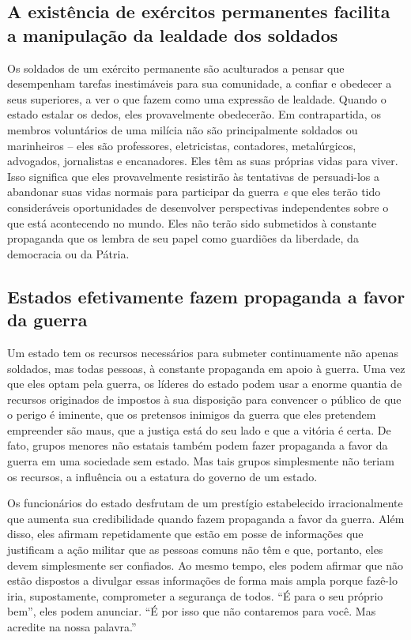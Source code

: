 \subsection*{A existência de exércitos permanentes facilita a manipulação da lealdade dos soldados}

Os soldados de um exército permanente são aculturados a pensar que desempenham tarefas inestimáveis para sua comunidade, a confiar e obedecer a seus superiores, a ver o que fazem como uma expressão de lealdade. Quando o estado estalar os dedos, eles provavelmente obedecerão. Em contrapartida, os membros voluntários de uma milícia não são principalmente soldados ou marinheiros -- eles são professores, eletricistas, contadores, metalúrgicos, advogados, jornalistas e encanadores. Eles têm as suas próprias vidas para viver. Isso significa que eles provavelmente resistirão às tentativas de persuadi-los a abandonar suas vidas normais para participar da guerra \emph{e} que eles terão tido consideráveis oportunidades de desenvolver perspectivas independentes sobre o que está acontecendo no mundo. Eles não terão sido submetidos à constante propaganda que os lembra de seu papel como guardiões da liberdade, da democracia ou da Pátria.

\subsection*{Estados efetivamente fazem propaganda a favor da guerra}

Um estado tem os recursos necessários para submeter continuamente não apenas soldados, mas todas pessoas, à constante propaganda em apoio à guerra. Uma vez que eles optam pela guerra, os líderes do estado podem usar a enorme quantia de recursos originados de impostos à sua disposição para convencer o público de que o perigo é iminente, que os pretensos inimigos da guerra que eles pretendem empreender são maus, que a justiça está do seu lado e que a vitória é certa. De fato, grupos menores não estatais também podem fazer propaganda a favor da guerra em uma sociedade sem estado. Mas tais grupos simplesmente não teriam os recursos, a influência ou a estatura do governo de um estado.

Os funcionários do estado desfrutam de um prestígio estabelecido irracionalmente que aumenta sua credibilidade quando fazem propaganda a favor da guerra. Além disso, eles afirmam repetidamente que estão em posse de informações que justificam a ação militar que as pessoas comuns não têm e que, portanto, eles devem simplesmente ser confiados. Ao mesmo tempo, eles podem afirmar que não estão dispostos a divulgar essas informações de forma mais ampla porque fazê-lo iria, supostamente, comprometer a segurança de todos. ``É para o seu próprio bem'', eles podem anunciar. ``É por isso que não contaremos para você. Mas acredite na nossa palavra.''

